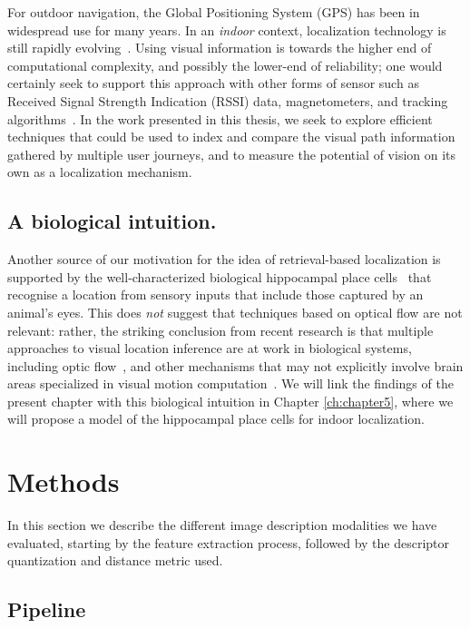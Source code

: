 For outdoor navigation, the Global Positioning System (GPS) has been in widespread use for many years.  In an {\it indoor} context, localization technology is still rapidly evolving~\cite{Shen,Wang2012,Quigley2010}.  Using visual information is towards the higher end of computational complexity, and possibly the lower-end of reliability; one would certainly seek to support this approach with other forms of sensor such as Received Signal Strength Indication (RSSI) data, magnetometers, and tracking algorithms~\cite{Schroth2011,Schroth2012,Quigley2010}.  In the work presented in this thesis, we seek to explore efficient techniques that could be used to index and compare the visual path information gathered by multiple user journeys, and to measure the potential of vision on its own as a localization mechanism. 
%
\subsection{A biological intuition.} Another source of our motivation for the idea of retrieval-based localization is supported by the well-characterized biological hippocampal place cells~\cite{burgess2002human} that recognise a location from sensory inputs that include those captured by an animal's eyes. This does {\it not} suggest that techniques based on optical flow are not relevant: rather, the striking conclusion from recent research is that multiple approaches to visual location inference are at work in biological systems, including optic flow~\cite{Layton2014}, and other mechanisms that may not explicitly involve brain areas specialized in visual motion computation~\cite{Hartley2014space}. We will link the findings of the present chapter with this biological intuition in Chapter \ref{ch:chapter5}, where we will propose a model of the hippocampal place cells for indoor localization.


\section{Methods}
\label{sec:methods}

In this section we describe the different image description modalities we have evaluated, starting by the feature extraction process, followed by the descriptor quantization and distance metric used.

\subsection{Pipeline}

